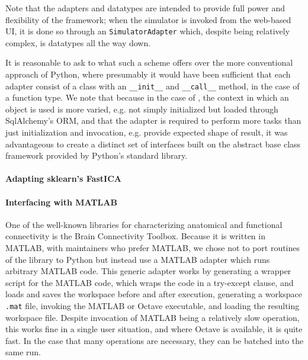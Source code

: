 
Note that the adapters and datatypes are intended to provide full 
power and flexibility of the framework; when the simulator is invoked from
the web-based UI, it is done so through an \texttt{SimulatorAdapter} which,
despite being relatively complex, is datatypes all the way down.

It is reasonable to ask to what such a scheme offers over the more 
conventional approach of Python, where presumably it would have been
sufficient that each adapter consist of a class with an \texttt{\_\_init\_\_}
and \texttt{\_\_call\_\_} method, in the case of a function type. 
We note that because in the case of \TVB, the context in which an object
is used is more varied, e.g. not simply initialized but loaded through 
SqlAlchemy's ORM, and that the adapter is required to perform more tasks
than just initialization and invocation, e.g. provide expected shape of 
result, it was advantageous to create a distinct set of interfaces built
on the abstract base class framework provided by Python's standard library.

\paragraph{Adapting sklearn's FastICA}

\paragraph{Interfacing with MATLAB}

One of the well-known libraries for characterizing anatomical 
and functional connectivity is the Brain Connectivity Toolbox. Because
it is written in MATLAB, with maintainers who prefer MATLAB, we 
chose not to port routines of the library to Python but instead use
a MATLAB adapter which runs arbitrary MATLAB code. This generic
adapter works by generating a wrapper script for the MATLAB code, which
wraps the code in a try-except clause, and loads and saves the workspace
before and after execution, 
generating a workspace \texttt{.mat} file, invoking the MATLAB or Octave
executable, and loading the resulting workspace file. Despite invocation
of MATLAB being a relatively slow operation, this works fine in a single
user situation, and where Octave is available, it is quite fast. In the 
case that many operations are necessary, they can be batched into the 
same run.


